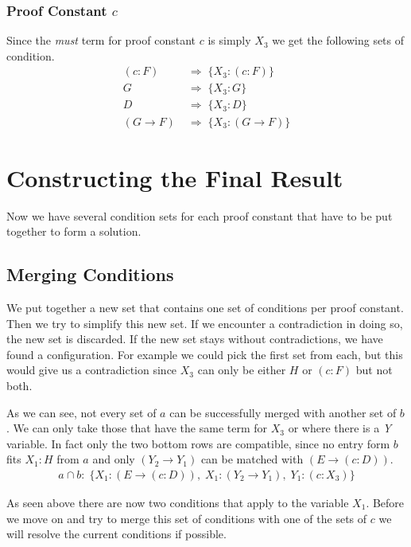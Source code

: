 \subsubsection[look up proof constant c]{Proof Constant $c$}
Since the \emph{must} term for proof constant $c$ is simply $X_3$ we get the following sets of condition.
\begin{align}
	(c:F) & \; \Rightarrow \; \{X_3: (c:F)\} \nonumber\\ 
	G & \; \Rightarrow \; \{X_3: G\} \nonumber\\ 
	D & \; \Rightarrow \; \{X_3: D\}\label{condition:c} \nonumber\\ 
	(G \rightarrow F) & \; \Rightarrow \; \{X_3: (G \rightarrow F)\} 
\end{align}

\section{Constructing the Final Result}
Now we have several condition sets for each proof constant that have to be put together to form a solution.
\subsection{Merging Conditions}
We put together a new set that contains one set of conditions per proof constant. Then we try to simplify this new set. If we encounter a contradiction in doing so, the new set is discarded. If the new set stays without contradictions, we have found a configuration.
For example we could pick the first set from each, but this would give us a contradiction since $X_3$ can only be either $H$ or $(c:F)$ but not both.

As we can see, not every set of $a$ can be successfully merged with another set of $b$. We can only take those that have the same term for $X_3$ or where there is a \emph{Y} variable. In fact only the two bottom rows are compatible, since no entry form $b$ fits $X_1: H$ from $a$ and only $(Y_2 \rightarrow Y_1)$ can be matched with $(E \rightarrow (c:D))$.
\begin{align}
	a \cap b: \; \{X_1: (E \rightarrow (c:D)), \; X_1: (Y_2 \rightarrow Y_1), \; Y_1: (c:X_3)\}
\end{align}

As seen above there are now two conditions that apply to the variable $X_1$. Before we move on and try to merge this set of conditions with one of the sets of $c$ we will resolve the current conditions if possible.

